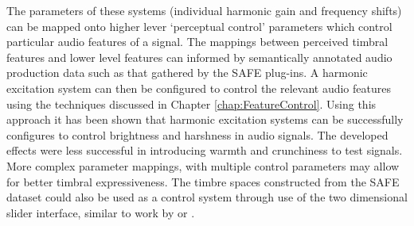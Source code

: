 	The parameters of these systems (individual harmonic gain and frequency shifts) can be mapped onto higher lever
	`perceptual control' parameters which control particular audio features of a signal. The mappings between perceived
	timbral features and lower level features can informed by semantically annotated audio production data such as that
	gathered by the SAFE plug-ins. A harmonic excitation system can then be configured to control the relevant audio
	features using the techniques discussed in Chapter \ref{chap:FeatureControl}. Using this approach it has been shown
	that harmonic excitation systems can be successfully configures to control brightness and harshness in audio
	signals. The developed effects were less successful in introducing warmth and crunchiness to test signals. More
	complex parameter mappings, with multiple control parameters may allow for better timbral expressiveness. The
	timbre spaces constructed from the SAFE dataset could also be used as a control system through use of the two
	dimensional slider interface, similar to work by \citet{schwarz2007corpus} or \citet{stasis2015a}.
